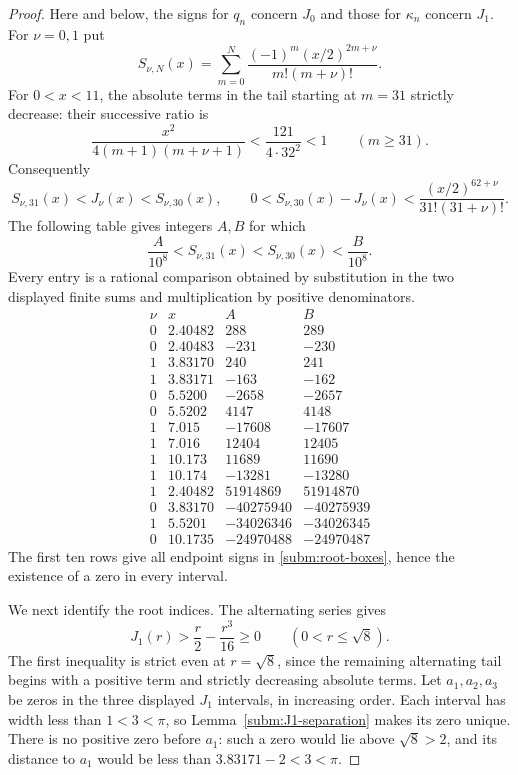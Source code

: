 \documentclass[11pt]{article}
\theoremstyle{remark}
\begin{document}
\begin{proof}
Here and below, the signs for $q_n$ concern $J_0$ and those for
$\kappa_n$ concern $J_1$.  For $\nu=0,1$ put
\[
 S_{\nu,N}(x)=\sum_{m=0}^N
 \frac{(-1)^m(x/2)^{2m+\nu}}{m!(m+\nu)!}.
\]
For $0<x<11$, the absolute terms in the tail starting at $m=31$
strictly decrease: their successive ratio is
\[
 \frac{x^2}{4(m+1)(m+\nu+1)}
 <\frac{121}{4\cdot32^2}<1\qquad(m\ge31).
\]
Consequently
\begin{equation}
 S_{\nu,31}(x)<J_\nu(x)<S_{\nu,30}(x),\qquad
 0<S_{\nu,30}(x)-J_\nu(x)
 <\frac{(x/2)^{62+\nu}}{31!(31+\nu)!}.
\end{equation}
The following table gives integers
$A,B$ for which
\[
 \frac A{10^8}<S_{\nu,31}(x)<S_{\nu,30}(x)<\frac B{10^8}.
\]
Every entry is a rational comparison obtained by substitution in the
two displayed finite sums and multiplication by positive denominators.
\begin{equation}\label{subm:rational-record}
\begin{array}{c|r|r|r}
 \nu&x&A&B\\\hline
 0&2.40482&288&289\\
 0&2.40483&-231&-230\\
 1&3.83170&240&241\\
 1&3.83171&-163&-162\\
 0&5.5200&-2658&-2657\\
 0&5.5202&4147&4148\\
 1&7.015&-17608&-17607\\
 1&7.016&12404&12405\\
 1&10.173&11689&11690\\
 1&10.174&-13281&-13280\\\hline
 1&2.40482&51914869&51914870\\
 0&3.83170&-40275940&-40275939\\
 1&5.5201&-34026346&-34026345\\
 0&10.1735&-24970488&-24970487
\end{array}
\end{equation}
The first ten rows give all endpoint signs in
\eqref{subm:root-boxes}, hence the existence of a zero in every
interval.

We next identify the root indices.  The alternating series gives
\[
 J_1(r)>\frac r2-\frac{r^3}{16}\ge0
 \qquad(0<r\le\sqrt8).
\]
The first inequality is strict even at $r=\sqrt8$, since the
remaining alternating tail begins with a positive term and strictly
decreasing absolute terms.  Let $a_1,a_2,a_3$ be zeros in the three
displayed $J_1$ intervals, in increasing order.  Each interval has
width less than $1<3<\pi$, so Lemma~\ref{subm:J1-separation}
makes its zero unique.  There is no positive zero before $a_1$:
such a zero would lie above $\sqrt8>2$, and its distance to $a_1$
would be less than $3.83171-2<3<\pi$.


\end{proof}
\end{document}
